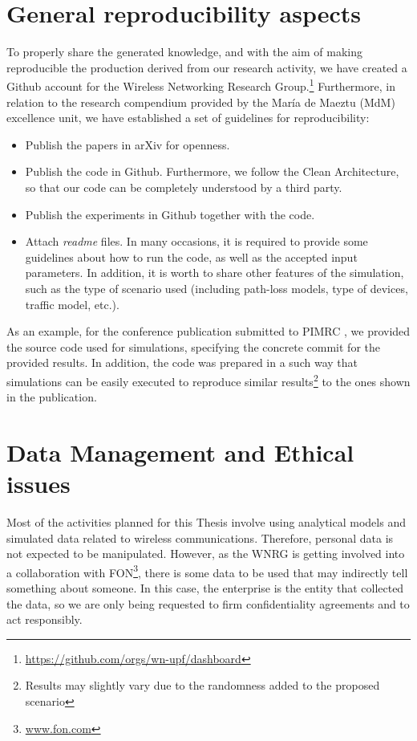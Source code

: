 \documentclass[12pt, a4paper,twoside]{article}
\begin{document}
	\section{General reproducibility aspects }
	\label{section:reproducibility}		
	To properly share the generated knowledge, and with the aim of making reproducible the production derived from our research activity, we have created a Github account for the Wireless Networking Research Group.\footnote{\url{https://github.com/orgs/wn-upf/dashboard}} Furthermore, in relation to the research compendium provided by the Mar\'ia de Maeztu (MdM) excellence unit, we have established a set of guidelines for reproducibility:
	\begin{itemize}
		\item Publish the papers in arXiv for openness.
		\item Publish the code in Github. Furthermore, we follow the Clean Architecture, so that our code can be completely understood by a third party.
		\item Publish the experiments in Github together with the code. 
		\item Attach \textit{readme} files. In many occasions, it is required to provide some guidelines about how to run the code, as well as the accepted input parameters. In addition, it is worth to share other features of the simulation, such as the type of scenario used (including path-loss models, type of devices, traffic model, etc.).
	\end{itemize}				
	As an example, for the conference publication submitted to PIMRC \cite{wilhelmi2017implications}, we provided the source code used for simulations, specifying the concrete commit for the provided results. In addition, the code was prepared in a such way that simulations can be easily executed to reproduce similar results\footnote{Results may slightly vary due to the randomness added to the proposed scenario} to the ones shown in the publication.
	
	\section{Data Management and Ethical issues}
	\label{section:data_mgm}	
	Most of the activities planned for this Thesis involve using analytical models and simulated data related to wireless communications. Therefore, personal data is not expected to be manipulated. However, as the WNRG is getting involved into a collaboration with FON\footnote{\url{www.fon.com}}, there is some data to be used that may indirectly tell something about someone. In this case, the enterprise is the entity that collected the data, so we are only being requested to firm confidentiality agreements and to act responsibly.
		
\end{document}
